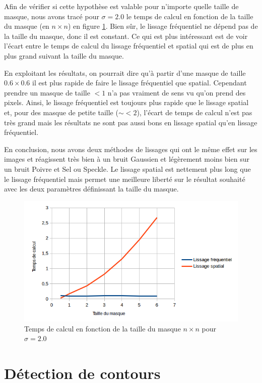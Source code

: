 \documentclass[paper=a4, fontsize=11pt]{scrartcl} %
\begin{document}
Afin de vérifier si cette hypothèse est valable pour n'importe quelle taille de masque, nous avons tracé pour $\sigma=2.0$ le temps de calcul en fonction de la taille du masque (en $n \times n$) en figure \ref{tempscalculmasque}. Bien sûr, le lissage fréquentiel ne dépend pas de la taille du masque, donc il est constant. Ce qui est plus intéressant est de voir l'écart entre le temps de calcul du lissage fréquentiel et spatial qui est de plus en plus grand suivant la taille du masque. 

En exploitant les résultats, on pourrait dire qu'à partir d'une masque de taille $0.6\times0.6$ il est plus rapide de faire le lissage fréquentiel que spatial. Cependant prendre un masque de taille $<1$ n'a pas vraiment de sens vu qu'on prend des pixels. Ainsi, le lissage fréquentiel est toujours plus rapide que le lissage spatial et, pour des masque de petite taille ($\sim <2$), l'écart de temps de calcul n'est pas très grand mais les résultats ne sont pas aussi bons en lissage spatial qu'en lissage fréquentiel.


En conclusion, nous avons deux méthodes de lissages qui ont le même effet sur les images et réagissent très bien à un bruit Gaussien et légèrement moins bien sur un bruit Poivre et Sel ou Speckle. Le lissage spatial est nettement plus long que le lissage fréquentiel mais permet une meilleure liberté sur le résultat souhaité avec les deux paramètres définissant la taille du masque. 

\begin{figure}
\centering
\caption{Temps de calcul en fonction de la taille du masque $n \times n$ pour $\sigma=2.0$}
\label{tempscalculmasque}
\includegraphics[scale=1]{images/rapport/courbes/temps_calcul_masque.png} 
\end{figure}

\section{Détection de contours}
\end{document}
